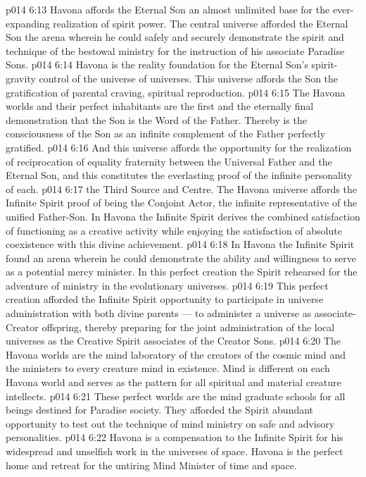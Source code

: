 \vs p014 6:13 Havona affords the Eternal Son an almost unlimited base for the ever\hyp{}expanding realization of spirit power. The central universe afforded the Eternal Son the arena wherein he could safely and securely demonstrate the spirit and technique of the bestowal ministry for the instruction of his associate Paradise Sons.
\vs p014 6:14 Havona is the reality foundation for the Eternal Son’s spirit\hyp{}gravity control of the universe of universes. This universe affords the Son the gratification of parental craving, spiritual reproduction.
\vs p014 6:15 The Havona worlds and their perfect inhabitants are the first and the eternally final demonstration that the Son is the Word of the Father. Thereby is the consciousness of the Son as an infinite complement of the Father perfectly gratified.
\vs p014 6:16 And this universe affords the opportunity for the realization of reciprocation of equality fraternity between the Universal Father and the Eternal Son, and this constitutes the everlasting proof of the infinite personality of each.
\vs p014 6:17 \bibnobreakspace {} the Third Source and Centre. The Havona universe affords the Infinite Spirit proof of being the Conjoint Actor, the infinite representative of the unified Father\hyp{}Son. In Havona the Infinite Spirit derives the combined satisfaction of functioning as a creative activity while enjoying the satisfaction of absolute coexistence with this divine achievement.
\vs p014 6:18 In Havona the Infinite Spirit found an arena wherein he could demonstrate the ability and willingness to serve as a potential mercy minister. In this perfect creation the Spirit rehearsed for the adventure of ministry in the evolutionary universes.
\vs p014 6:19 This perfect creation afforded the Infinite Spirit opportunity to participate in universe administration with both divine parents --- to administer a universe as associate\hyp{}Creator offspring, thereby preparing for the joint administration of the local universes as the Creative Spirit associates of the Creator Sons.
\vs p014 6:20 The Havona worlds are the mind laboratory of the creators of the cosmic mind and the ministers to every creature mind in existence. Mind is different on each Havona world and serves as the pattern for all spiritual and material creature intellects.
\vs p014 6:21 These perfect worlds are the mind graduate schools for all beings destined for Paradise society. They afforded the Spirit abundant opportunity to test out the technique of mind ministry on safe and advisory personalities.
\vs p014 6:22 Havona is a compensation to the Infinite Spirit for his widespread and unselfish work in the universes of space. Havona is the perfect home and retreat for the untiring Mind Minister of time and space.
